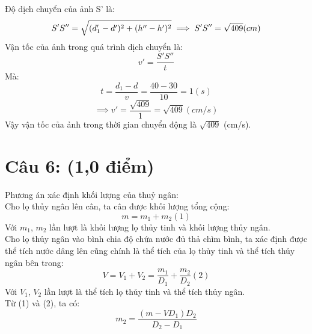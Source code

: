 \documentclass[50pt]{article}
\begin{document}
Độ dịch chuyển của ảnh S' là:\\
\begin{equation*}
    S'S'' = \sqrt{(d_{1}' - d')^2 + (h'' - h')^2}\\
    \implies S'S'' = \sqrt{409} (cm)\\
\end{equation*}
Vận tốc của ảnh trong quá trình dịch chuyển là:\\
\begin{equation*}
    v' = \dfrac{S'S''}{t}
\end{equation*}
Mà:
\begin{equation*}
    t = \dfrac{d_{1} - d}{v} = \dfrac{40 - 30}{10} = 1 (s)
\end{equation*}
\begin{equation*}
    \implies v' = \dfrac{\sqrt{409}}{1} = \sqrt{409} (cm/s)
\end{equation*}
Vậy vận tốc của ảnh trong thời gian chuyển động là $\sqrt{409}$ (cm/s).
\section*{Câu 6: (1,0 điểm)}
Phương án xác định khối lượng của thuỷ ngân:\\
Cho lọ thủy ngân lên cân, ta cân được khối lượng tổng cộng:
\begin{equation*}
    m = m_{1} + m_{2} (1)
\end{equation*}
Với $m_{1}$, $m_{2}$ lần lượt là khối lượng lọ thủy tinh và khối lượng thủy ngân.\\
Cho lọ thủy ngân vào bình chia độ chứa nước đủ thả chìm bình, ta xác định được thể tích nước dâng lên cũng chính là thể tích của lọ thủy tinh và thể tích thủy ngân bên trong:
\begin{equation*}
    V = V_{1} + V_{2} = \dfrac{m_{1}}{D_{1}} + \dfrac{m_{2}}{D_{2}} (2)
\end{equation*}
Với $V_{1}$, $V_{2}$ lần lượt là thể tích lọ thủy tinh và thể tích thủy ngân.\\
Từ (1) và (2), ta có:\\
\begin{equation*}
    m_{2} = \dfrac{(m - VD_{1})D_{2}}{D_{2} - D_{1}}
\end{equation*}
\end{document}
